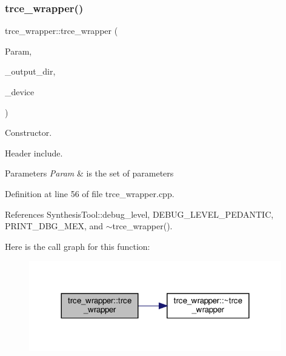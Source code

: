 \subsubsection{\texorpdfstring{trce\+\_\+wrapper()}{trce\_wrapper()}}
{\footnotesize\ttfamily trce\+\_\+wrapper\+::trce\+\_\+wrapper (\begin{DoxyParamCaption}\item[{const \hyperlink{Parameter_8hpp_a37841774a6fcb479b597fdf8955eb4ea}{Parameter\+Const\+Ref} \&}]{Param,  }\item[{const std\+::string \&}]{\+\_\+output\+\_\+dir,  }\item[{const \hyperlink{target__device_8hpp_acedb2b7a617e27e6354a8049fee44eda}{target\+\_\+device\+Ref} \&}]{\+\_\+device }\end{DoxyParamCaption})}



Constructor. 

Header include.


\begin{DoxyParams}{Parameters}
{\em Param} & is the set of parameters \\
\hline
\end{DoxyParams}


Definition at line 56 of file trce\+\_\+wrapper.\+cpp.



References Synthesis\+Tool\+::debug\+\_\+level, D\+E\+B\+U\+G\+\_\+\+L\+E\+V\+E\+L\+\_\+\+P\+E\+D\+A\+N\+T\+IC, P\+R\+I\+N\+T\+\_\+\+D\+B\+G\+\_\+\+M\+EX, and $\sim$trce\+\_\+wrapper().

Here is the call graph for this function\+:
\nopagebreak
\begin{figure}[H]
\begin{center}
\leavevmode
\includegraphics[width=312pt]{dc/db5/classtrce__wrapper_a5ba24404b3a8f27ab07acc5f6a1691ed_cgraph}
\end{center}
\end{figure}
\mbox{\label{classtrce__wrapper_af149e5b47b80b3334262d8fb87046e57}} 
